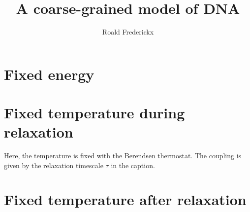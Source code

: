 \documentclass[11pt,a4paper]{article}
\begin{document}
\author{Roald Frederickx}
\title{A coarse-grained model of DNA}
\date{}
\maketitle

\section{Fixed energy}











\FloatBarrier

\section{Fixed temperature during relaxation}
Here, the temperature is fixed with the Berendsen thermostat. The coupling is given by the relaxation timescale $\tau$ in the caption.












\FloatBarrier

\section{Fixed temperature after relaxation}










\end{document}
